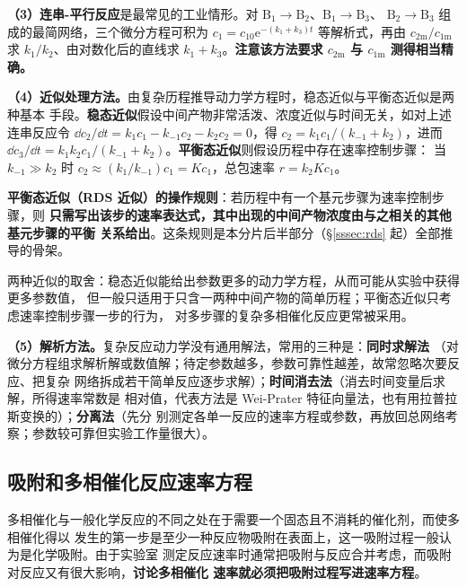 \textbf{（3）连串-平行反应}是最常见的工业情形。对
$\mathrm{B_1}\to\mathrm{B_2}$、$\mathrm{B_1}\to\mathrm{B_3}$、
$\mathrm{B_2}\to\mathrm{B_3}$ 组成的最简网络，三个微分方程可积为
$c_1=c_{10}\mathrm{e}^{-(k_1+k_3)t}$ 等解析式，再由 $c_{2\mathrm m}/c_{1\mathrm m}$ 求
$k_1/k_2$、由对数化后的直线求 $k_1+k_3$。\textbf{注意该方法要求 $c_{2\mathrm m}$ 与
$c_{1\mathrm m}$ 测得相当精确。}

\textbf{（4）近似处理方法。}由复杂历程推导动力学方程时，稳态近似与平衡态近似是两种基本
手段。\textbf{稳态近似}假设中间产物非常活泼、浓度近似与时间无关，如对上述连串反应令
$\dd c_2/\dd t=k_1c_1-k_{-1}c_2-k_2c_2=0$，得 $c_2=k_1c_1/(k_{-1}+k_2)$，进而
$\dd c_3/\dd t=k_1k_2c_1/(k_{-1}+k_2)$。\textbf{平衡态近似}则假设历程中存在速率控制步骤：
当 $k_{-1}\gg k_2$ 时 $c_2\approx(k_1/k_{-1})c_1=Kc_1$，总包速率
$r=k_2Kc_1$。

\begin{principle}
\textbf{平衡态近似（RDS 近似）的操作规则}：若历程中有一个基元步骤为速率控制步骤，则
\textbf{只需写出该步的速率表达式，其中出现的中间产物浓度由与之相关的其他基元步骤的平衡
关系给出}。这条规则是本分片后半部分（§\ref{sssec:rds} 起）全部推导的骨架。
\end{principle}

两种近似的取舍：稳态近似能给出参数更多的动力学方程，从而可能从实验中获得更多参数值，
但一般只适用于只含一两种中间产物的简单历程；平衡态近似只考虑速率控制步骤一步的行为，
对多步骤的复杂多相催化反应更常被采用。

\textbf{（5）解析方法。}复杂反应动力学没有通用解法，常用的三种是：\textbf{同时求解法}
（对微分方程组求解析解或数值解；待定参数越多，参数可靠性越差，故常忽略次要反应、把复杂
网络拆成若干简单反应逐步求解）；\textbf{时间消去法}（消去时间变量后求解，所得速率常数是
相对值，代表方法是 Wei-Prater 特征向量法，也有用拉普拉斯变换的）；\textbf{分离法}（先分
别测定各单一反应的速率方程或参数，再放回总网络考察；参数较可靠但实验工作量很大）。

\subsection{吸附和多相催化反应速率方程}

多相催化与一般化学反应的不同之处在于需要一个固态且不消耗的催化剂，而使多相催化得以
发生的第一步是至少一种反应物吸附在表面上，这一吸附过程一般认为是化学吸附。由于实验室
测定反应速率时通常把吸附与反应合并考虑，而吸附对反应又有很大影响，\textbf{讨论多相催化
速率就必须把吸附过程写进速率方程}。

